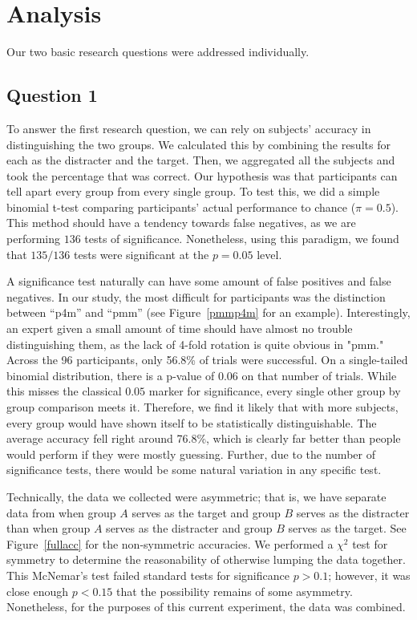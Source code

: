 \section{Analysis}
Our two basic research questions were addressed individually.

\subsection{Question 1}
To answer the first research question, we can rely on subjects' accuracy in distinguishing the two groups. We calculated this by combining the results for each as the distracter and the target. Then, we aggregated all the subjects and took the percentage that was correct. Our hypothesis was that participants can tell apart every group from every single group. To test this, we did a simple binomial t-test comparing participants' actual performance to chance ($\pi=0.5$). This method should have a tendency towards false negatives, as we are performing $136$ tests of significance. Nonetheless, using this paradigm, we found that $135/136$ tests were significant at the $p=0.05$ level.  

A significance test naturally can have some amount of false positives and false negatives. In our study, the most difficult for participants was the distinction between “p4m” and “pmm” (see Figure~\ref{pmmp4m} for an example). Interestingly, an expert given a small amount of time should have almost no trouble distinguishing them, as the lack of 4-fold rotation is quite obvious in "pmm." Across the 96 participants, only 56.8\% of trials were successful. On a single-tailed binomial distribution, there is a p-value of $0.06$ on that number of trials. While this misses the classical $0.05$ marker for significance, every single other group by group comparison meets it. Therefore, we find it likely that with more subjects, every group would have shown itself to be statistically distinguishable. The average accuracy fell right around 76.8\%, which is clearly far better than people would perform if they were mostly guessing. Further, due to the number of significance tests, there would be some natural variation in any specific test.

Technically, the data we collected were asymmetric; that is, we have separate data from when group $A$ serves as the target and group $B$ serves as the distracter than when group $A$ serves as the distracter and group $B$ serves as the target. See Figure~\ref{fullacc} for the non-symmetric accuracies. We performed a $\chi^2$ test for symmetry to determine the reasonability of otherwise lumping the data together. This McNemar's test failed standard tests for significance $p > 0.1$; however, it was close enough $p < 0.15$ that the possibility remains of some asymmetry. Nonetheless, for the purposes of this current experiment, the data was combined.

